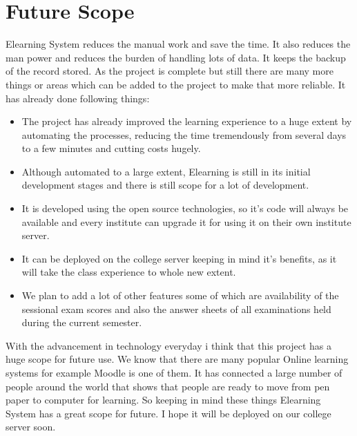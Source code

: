 \section{Future Scope}
Elearning System reduces the manual work and save the time. It also reduces 
the man power and reduces the burden of handling lots of data. It keeps the backup 
of the record stored. As the project is complete but still there are many more 
things or areas which can be added to the project to make that more reliable. 
It has already done following things:
\begin{itemize}
\item The project has already improved the learning experience to a huge extent
by automating the processes, reducing the time tremendously from several days to a
few minutes and cutting costs hugely.
\item Although automated to a large extent, Elearning is still in its initial development stages and there is still scope for a lot of development.
\item It is developed using the open source technologies, so it's code will always be available and every institute can upgrade it for using it on their own institute server.
\item It can be deployed on the college server keeping in mind it's benefits, as it will take the class experience to whole new extent.
\item We plan to add a lot of other features some of which are availability of the sessional exam scores and also the answer sheets of all examinations held during the current semester.
\end{itemize}

\noindent With the advancement in technology everyday i think that this project has a huge scope for future use. We know that there are many popular Online learning systems for example Moodle is one of them. It has connected a large number of people around the world that shows that people are ready to move from pen paper to computer for learning. So keeping in mind these things Elearning System has a great scope for future. I hope it will be deployed on our college server soon.

